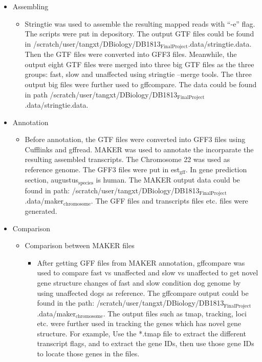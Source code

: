 \documentclass[11pt]{article}
\begin{document}
\begin{itemize}
\item Assembling

\begin{itemize}
\item Stringtie was used to assemble the resulting mapped reads with ``-e'' flag. The scripts were put in depository. The output GTF files could be found in /scratch/user/tangxt/DBiology/DB1813$_{\mathrm{FinalProject}}$.data/stringtie.data.
     Then the GTF files were converted into GFF3 files. Meanwhile, the output eight GTF files were merged into three big GTF files as the three groups: fast, slow and unaffected using stringtie --merge tools. The three output big files 
     were further used to gffcompare. The data could be found in path /scratch/user/tangxt/DBiology/DB1813$_{\mathrm{FinalProject}}$.data/stringtie.data.
\end{itemize}

\item Annotation

\begin{itemize}
\item Before annotation, the GTF files were converted into GFF3 files using Cufflinks and gffread. MAKER was used to annotate the incorparate the
     resulting assembled transcripts. The Chromosome 22 was used as reference genome. The GFF3 files were put in est$_{\mathrm{gff}}$. In gene prediction section, augustus$_{\mathrm{species}}$
     is human. The MAKER output data could be found in path: /scratch/user/tangxt/DBiology/DB1813$_{\mathrm{FinalProject}}$.data/maker$_{\mathrm{chromosome}}$. The GFF files and transcripts files etc. files
     were generated.
\end{itemize}

\item Comparison

\begin{itemize}
\item Comparison between MAKER files

\begin{itemize}
\item After getting GFF files from MAKER annotation, gffcompare was used to compare fast vs unaffected and slow vs unaffected to get novel gene
      structure changes of fast and slow condition dog genome by using unaffected dogs as reference. The gffcompare output could be found in the path:
      /scratch/user/tangxt/DBiology/DB1813$_{\mathrm{FinalProject}}$.data/maker$_{\mathrm{chromosome}}$. The output files such as tmap, tracking, loci etc. were further used in
      tracking the genes which has novel gene structure. For example, Use the *.tmap file to extract the different transcript flags, and to extract the gene IDs,
      then use those gene IDs to locate those genes in the files.
\end{itemize}


\end{itemize}
\end{itemize}
\end{document}
